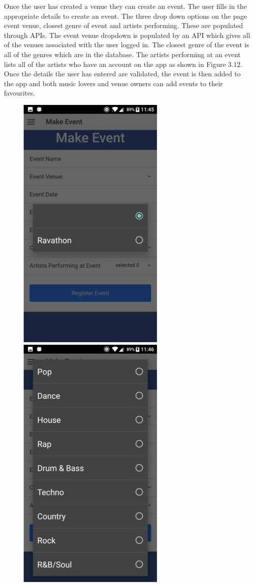 Once the user has created a venue they can create an event. The user fills in the appropriate details to create an event. The three drop down options on the page event venue, closest genre of event and artists performing. These are populated through APIs. The event venue dropdown is populated by an API which gives all of the venues associated with the user logged in. The closest genre of the event is all of the genres which are in the database. The artists performing at an event lists all of the  artists who have an account on the app as shown in Figure 3.12. Once the details the user has entered are validated, the event is then added to the app and both music lovers and venue owners can add events to their favourites. 
\begin{center}
\begin{figure}[H]
\includegraphics[scale=0.5]{images/sc16}
\includegraphics[scale=0.5]{images/sc17}

\end{figure}
\end{center}
